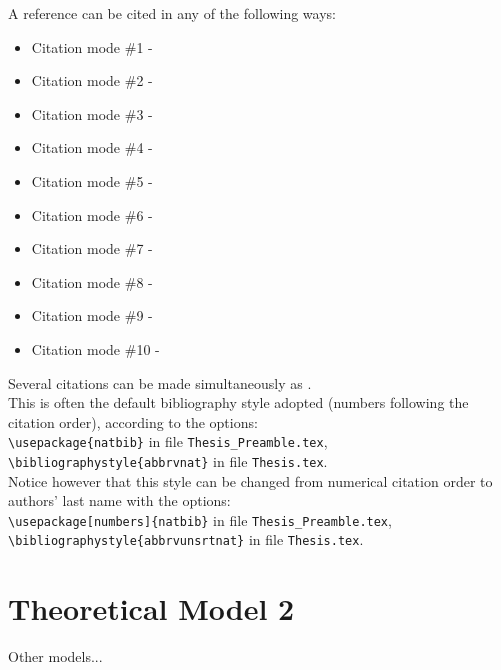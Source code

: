 A reference can be cited in any of the following ways:
%
\begin{itemize}
  \item Citation mode \#1 - \quad \cite{jameson:adjointns}
  \item Citation mode \#2 - \quad \citet{jameson:adjointns}
  \item Citation mode \#3 - \quad \citep{jameson:adjointns}
  \item Citation mode \#4 - \quad \citet*{jameson:adjointns}
  \item Citation mode \#5 - \quad \citep*{jameson:adjointns}
  \item Citation mode \#6 - \quad \citealt{jameson:adjointns}
  \item Citation mode \#7 - \quad \citealp{jameson:adjointns}
  \item Citation mode \#8 - \quad \citeauthor{jameson:adjointns}
  \item Citation mode \#9 - \quad \citeyear{jameson:adjointns}
  \item Citation mode \#10 - \quad \citeyearpar{jameson:adjointns}
\end{itemize}
%
Several citations can be made simultaneously as \citep{nocedal:opt,marta:ijcfd}. \\

This is often the default bibliography style adopted (numbers following the citation order), according to the options:\\
{\tt \textbackslash usepackage\{natbib\}} in file {\tt Thesis\_Preamble.tex},\\
{\tt \textbackslash bibliographystyle\{abbrvnat\}} in file {\tt Thesis.tex}.\\
%
Notice however that this style can be changed from numerical citation order to authors' last name with the options: \\
{\tt \textbackslash usepackage[numbers]\{natbib\}} in file {\tt Thesis\_Preamble.tex},\\
{\tt \textbackslash bibliographystyle\{abbrvunsrtnat\}} in file {\tt Thesis.tex}.


\section{Theoretical Model 2}
\label{section:theory2}

Other models...

